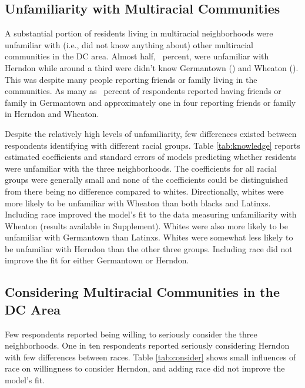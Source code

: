 \documentclass{baderart}
\begin{document}
\subsection{Unfamiliarity with Multiracial Communities}\label{unfamiliarity-with-multiracial-communities}

A substantial portion of residents living in multiracial neighborhoods were unfamiliar with (i.e., did not know anything about) other multiracial communities in the DC area. Almost half, \dkherndon~percent, were unfamiliar with Herndon while around a third were didn't know Germantown (\dkgermantown) and Wheaton (\dkwheaton). This was despite many people reporting friends or family living in the communities. As many as \ffgermantown~percent of respondents reported having friends or family in Germantown and approximately one in four reporting friends or family in Herndon and Wheaton.

Despite the relatively high levels of unfamiliarity, few differences existed between respondents identifying with different racial groups. Table \ref{tab:knowledge} reports estimated coefficients and standard errors of models predicting whether residents were unfamiliar with the three neighborhoods. The coefficients for all racial groups were generally small and none of the coefficients could be distinguished from there being no difference compared to whites. Directionally, whites were more likely to be unfamiliar with Wheaton than both blacks and Latinxs. Including race improved the model's fit to the data measuring unfamiliarity with Wheaton (results available in Supplement). Whites were also more likely to be unfamiliar with Germantown than Latinxs. Whites were somewhat less likely to be unfamiliar with Herndon than the other three groups. Including race did not improve the fit for either Germantown or Herndon. 


\subsection{Considering Multiracial Communities in the DC Area}
Few respondents reported being willing to seriously consider the three neighborhoods. One in ten respondents reported seriously considering Herndon with few differences between races. Table \ref{tab:consider} shows small influences of race on willingness to consider Herndon, and adding race did not improve the model's fit. 

\end{document}
